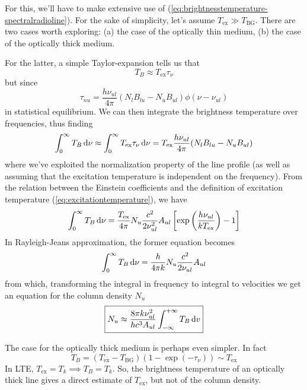 For this, we'll have to make extensive use of (\ref{eq:brightnesstemperature-spectralradioline}). For the sake of simplicity, let's assume $T_{\text{ex}} \gg T_{\text{BG}}$. There are two cases worth exploring: (a) the case of the optically thin medium, (b) the case of the optically thick medium.
\par For the latter, a simple Taylor-expansion tells us that 
\begin{equation*}
    T_{B} \approx T_{\text{ex}}\tau_{\nu}
\end{equation*}
but since 
\begin{equation*}
    \tau_{nu} = \frac{h\nu_{ul}}{4\pi}(N_{l}B_{lu}-N_{u}B_{ul})\phi(\nu-\nu_{ul})
\end{equation*}
in statistical equilibrium. We can then integrate the brightness temperature over frequencies, thus finding 
\begin{equation*}
    \int_{0}^{\infty} T_{B}\,\text{d}\nu \approx \int_{0}^{\infty}T_{\text{ex}}\tau_{\nu}\,\text{d}\nu = T_{\text{ex}}\frac{h\nu_{ul}}{4\pi}(N_{l}B_{lu}-N_{u}B_{ul})
\end{equation*}
where we've exploited the normalization property of the line profile (as well as assuming that the excitation temperature is independent on the frequency). From the relation between the Einstein coefficients and the definition of excitation temperature (\ref{eq:excitationtemperature}), we have 
\begin{equation}
    \int_{0}^{\infty} T_{B}\,\text{d}\nu = \frac{T_{\text{ex}}}{4\pi}N_{u}\frac{c^{2}}{2\nu_{ul}^{2}}A_{ul}\left[\exp\left(\frac{h\nu_{ul}}{kT_{\text{ex}}}\right)-1\right]
\end{equation}
In Rayleigh-Jeans approximation, the former equation becomes
\begin{equation*}
    \int_{0}^{\infty} T_{B}\,\text{d}\nu = \frac{h}{4\pi k }N_{u}\frac{c^{2}}{2\nu_{ul}}A_{ul}
\end{equation*}
from which, transforming the integral in frequency to integral to velocities we get an equation for the column density $N_{u}$
\begin{equation}
    \boxed{
        N_{u} \approx \frac{8\pi k \nu_{ul}^{2}}{hc^{3}A_{ul}}\int_{-\infty}^{+\infty}T_{B}\,\text{d}v
    }
\end{equation}
\par The case for the optically thick medium is perhaps even simpler.
In fact
\begin{equation*}
    T_{B} = (T_{\text{ex}}-T_{\text{BG}})(1-\exp(-\tau_{\nu}))\sim T_{\text{ex}}
\end{equation*}
In LTE, $T_{\text{ex}} = T_{k} \implies T_{B} = T_{k}$. So, the brightness temperature of an optically thick line gives a direct estimate of $T_{\text{ex}}$, but not of the column density.

